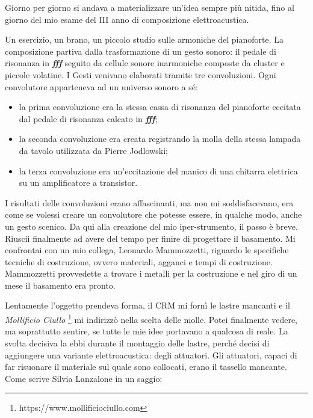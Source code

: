 Giorno per giorno si andava a materializzare un'idea sempre più nitida, fino al giorno del mio esame del III anno di composizione elettroacustica.

Un esercizio, un brano, un piccolo studio sulle armoniche del pianoforte. La composizione partiva dalla trasformazione di un gesto sonoro: il pedale di risonanza in \textit{\textbf{fff}} seguito da cellule sonore inarmoniche composte da cluster e piccole volatine. I Gesti venivano elaborati tramite tre convoluzioni. Ogni convolutore apparteneva ad un universo sonoro a sé:
\begin{itemize}
\item{la prima convoluzione era la stessa cassa di risonanza del pianoforte eccitata dal pedale di risonanza calcato in \textit{\textbf{fff}};}
\item{la seconda convoluzione era creata registrando la molla della stessa lampada da tavolo utilizzata da Pierre Jodlowski;}
\item{la terza convoluzione era un'eccitazione del manico di una chitarra elettrica su un amplificatore a transistor.}
\end{itemize}

%

I risultati delle convoluzioni erano affascinanti, ma non mi soddisfacevano,  era come se volessi creare un convolutore che potesse essere, in qualche modo, anche un gesto scenico. Da qui alla creazione del mio iper-strumento, il passo è breve. Riuscii finalmente ad avere del tempo per finire di progettare il basamento. Mi confrontai con un mio collega, Leonardo Mammozzetti, riguardo le specifiche tecniche di costruzione, ovvero materiali, agganci e tempi di costruzione. Mammozzetti provvedette a trovare i metalli per la costruzione e nel giro di un mese il basamento era pronto.

Lentamente l'oggetto prendeva forma, il CRM mi fornì le lastre mancanti e il \textit{Mollificio Ciullo} \footnote{https://www.mollificiociullo.com} mi indirizzò nella scelta delle molle. Potei finalmente vedere, ma soprattutto sentire, se tutte le mie idee portavano a qualcosa di reale. La svolta decisiva la ebbi durante il montaggio delle lastre, perché decisi di aggiungere una variante elettroacustica: degli attuatori. Gli attuatori, capaci di far risuonare il materiale sul quale sono collocati, erano il tassello mancante. Come scrive Silvia Lanzalone in un saggio:

